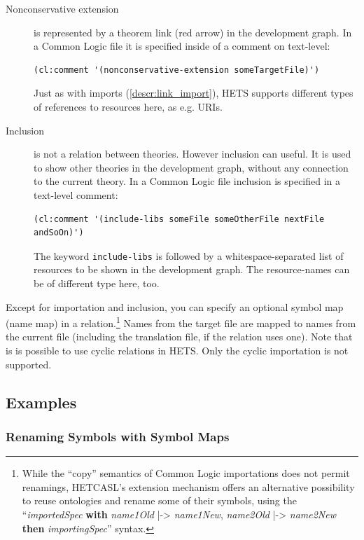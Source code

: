\documentclass{article}
\newcommand{\normalTEXTSC}[2]{{#1\scriptsize#2}}
\newcommand     {\Hets}{\normalTEXTSC{H}{ETS}\xspace}
\newcommand{\HetCASL}{\normalTEXTSC{H}{ET}\normalTEXTSC{C}{ASL}\xspace}
\begin{document}
\begin{description}
\item[Nonconservative extension]
  is represented by a theorem link (red arrow) in the development graph. In a 
  Common Logic file it is specified inside of a comment on text-level:
  
  \begin{lstlisting}[language=clif]
(cl:comment '(nonconservative-extension someTargetFile)')
  \end{lstlisting}
  Just as with imports (\ref{descr:link_import}), \Hets supports different types 
  of references to resources here, as e.g. URIs.
  

\item[Inclusion]
  is not a relation between theories. However inclusion can useful. It is used 
  to show other theories in the development graph, without any connection 
  to the current theory. In a Common Logic file inclusion is specified in a 
  text-level comment:
  \begin{lstlisting}[language=clif]
(cl:comment '(include-libs someFile someOtherFile nextFile andSoOn)')
  \end{lstlisting}
  The keyword \texttt{include-libs} is followed by a whitespace-separated list 
  of resources to be shown in the development graph. The resource-names can be 
  of different type here, too.
\end{description}

Except for importation and inclusion, you can specify an optional symbol map 
(name map) in a relation.\footnote{While the ``copy'' semantics of Common Logic importations does not permit renamings, \HetCASL's extension mechanism offers an alternative possibility to reuse ontologies and rename some of their symbols, using the ``\textit{importedSpec} \textbf{with} \textit{name1Old} |-> \textit{name1New}, \textit{name2Old} |-> \textit{name2New} \textbf{then} \textit{importingSpec}'' syntax.}
 Names from the target file are mapped to names from the current 
file (including the translation file, if the relation uses one).  Note that is is possible to use cyclic relations in \Hets. Only the cyclic 
importation is not supported.

\subsection{Examples}
\label{sec:examples}

\subsubsection{Renaming Symbols with Symbol Maps}
\label{sec:renam-symb-with}
\end{document}
